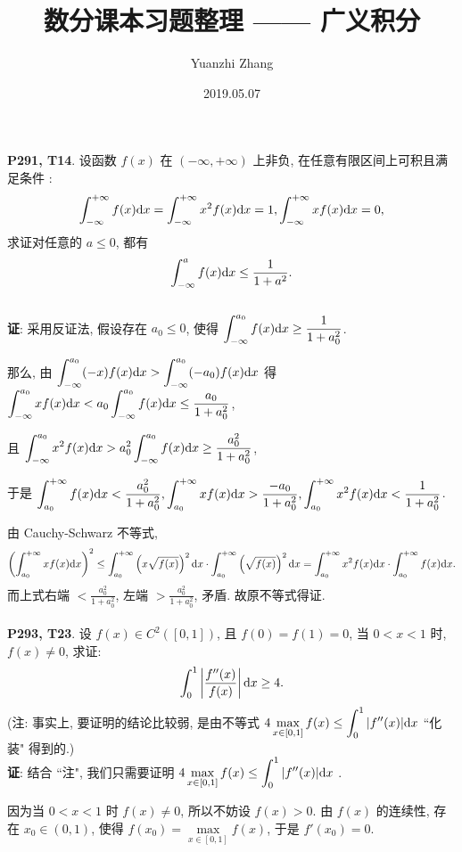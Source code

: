 \documentclass[UTF8]{ctexart}
\title{数分课本习题整理 —— 广义积分}
\author{Yuanzhi Zhang}
\date{2019.05.07}
\begin{document}
\maketitle
\textbf{P291, T14}. 设函数 $f(x)$ 在 $(-\infty,+\infty)$ 上非负, 在任意有限区间上可积且满足条件 :
\[
\int_{-\infty}^{+\infty}f(x){\rm d}x = \int_{-\infty}^{+\infty}x^2f(x){\rm d}x = 1, \int_{-\infty}^{+\infty}xf(x){\rm d}x = 0,
\]
求证对任意的 $a\leq0$, 都有
\[
\int_{-\infty}^{a}f(x){\rm d}x\leq\frac{1}{1+a^2}.
\]
~\\

\textbf{证}: 采用反证法, 假设存在 $a_0\leq0$, 使得 $\displaystyle\int_{-\infty}^{a_0}f(x){\rm d}x\geq\frac{1}{1+a_0^2}$.

那么, 由 $\displaystyle\int_{-\infty}^{a_0}(-x)f(x){\rm d}x>\int_{-\infty}^{a_0}(-a_0)f(x){\rm d}x$ 得 $\displaystyle\int_{-\infty}^{a_0}xf(x){\rm d}x<a_0\int_{-\infty}^{a_0}f(x){\rm d}x\leq\frac{a_0}{1+a_0^2}$,

且 $\displaystyle\int_{-\infty}^{a_0}x^2f(x){\rm d}x>a_0^2\int_{-\infty}^{a_0}f(x){\rm d}x\geq\frac{a_0^2}{1+a_0^2}$,

于是 $\displaystyle\int_{a_0}^{+\infty}f(x){\rm d}x<\frac{a_0^2}{1+a_0^2}, \int_{a_0}^{+\infty}xf(x){\rm d}x>\frac{-a_0}{1+a_0^2}, \int_{a_0}^{+\infty}x^2f(x){\rm d}x<\frac{1}{1+a_0^2}$.

由 Cauchy-Schwarz 不等式,
\[
\displaystyle\left(\int_{a_0}^{+\infty}xf(x){\rm d}x\right)^2\leq\int_{a_0}^{+\infty}\left(x\sqrt{f(x)}\right)^2{\rm d}x\cdot\int_{a_0}^{+\infty}\left(\sqrt{f(x)}\right)^2{\rm d}x=\int_{a_0}^{+\infty}x^2f(x){\rm d}x\cdot\int_{a_0}^{+\infty}f(x){\rm d}x.
\]
而上式右端 $<\displaystyle\frac{a_0^2}{1+a_0^2}$, 左端 $>\displaystyle\frac{a_0^2}{1+a_0^2}$, 矛盾. 故原不等式得证.
~\\
~\\

\textbf{P293, T23}. 设 $f(x)\in C^2([0,1])$, 且 $f(0)=f(1)=0$, 当 $0<x<1$ 时, $f(x)\neq0$, 求证:
\[
\int_{0}^{1}\left|\frac{f''(x)}{f(x)}\right|{\rm d}x\geq4.
\]
(注: 事实上, 要证明的结论比较弱, 是由不等式 $4\max\limits_{x\in[0,1]} f(x)\leq\displaystyle\int_{0}^{1}|f''(x)|{\rm d}x$ ``化装" 得到的.)
~\\

\textbf{证}: 结合 ``注", 我们只需要证明 $4\max\limits_{x\in[0,1]} f(x)\leq\displaystyle\int_{0}^{1}|f''(x)|{\rm d}x$ .

因为当 $0<x<1$ 时 $f(x)\neq0$, 所以不妨设 $f(x)>0$. 由 $f(x)$ 的连续性, 存在 $x_0\in(0,1)$, 使得 $f(x_0)=\max\limits_{x\in[0,1]} f(x)$, 于是 $f'(x_0)=0$.
\end{document}
